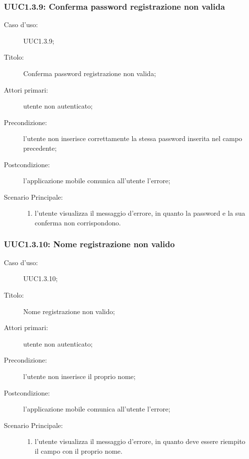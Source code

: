\documentclass[../../../analisi-dei-requisiti.tex]{subfiles}
\begin{document}
\subsubsection{UUC1.3.9: Conferma password registrazione non valida}%
\label{subs:UUC1.3.9}
\begin{description}
  \item[Caso d'uso:] UUC1.3.9;
  \item[Titolo:] Conferma password registrazione non valida;
  \item[Attori primari:] utente non autenticato;
  \item[Precondizione:] l'utente non inserisce correttamente la stessa password inserita nel campo precedente;
  \item[Postcondizione:] l'applicazione mobile comunica all'utente l'errore;
  \item[Scenario Principale:]
        \begin{enumerate}
          \item l'utente visualizza il messaggio d'errore, in quanto la password e la sua conferma non corrispondono.
        \end{enumerate}
\end{description}

\subsubsection{UUC1.3.10: Nome registrazione non valido}%
\label{subs:UUC1.3.10}
\begin{description}
  \item[Caso d'uso:] UUC1.3.10;
  \item[Titolo:] Nome registrazione non valido;
  \item[Attori primari:] utente non autenticato;
  \item[Precondizione:] l'utente non inserisce il proprio nome;
  \item[Postcondizione:] l'applicazione mobile comunica all'utente l'errore;
  \item[Scenario Principale:]
        \begin{enumerate}
          \item l'utente visualizza il messaggio d'errore, in quanto deve essere riempito il campo con il proprio nome.
        \end{enumerate}
\end{description}
\end{document}
